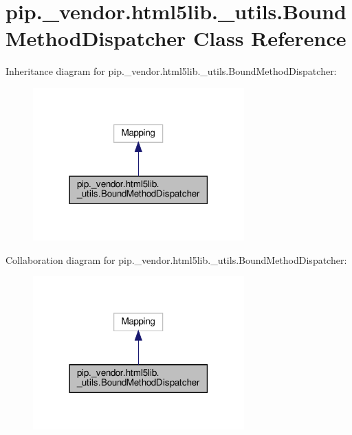 \hypertarget{classpip_1_1__vendor_1_1html5lib_1_1__utils_1_1BoundMethodDispatcher}{}\section{pip.\+\_\+vendor.\+html5lib.\+\_\+utils.\+Bound\+Method\+Dispatcher Class Reference}
\label{classpip_1_1__vendor_1_1html5lib_1_1__utils_1_1BoundMethodDispatcher}


Inheritance diagram for pip.\+\_\+vendor.\+html5lib.\+\_\+utils.\+Bound\+Method\+Dispatcher\+:
\nopagebreak
\begin{figure}[H]
\begin{center}
\leavevmode
\includegraphics[width=230pt]{classpip_1_1__vendor_1_1html5lib_1_1__utils_1_1BoundMethodDispatcher__inherit__graph}
\end{center}
\end{figure}


Collaboration diagram for pip.\+\_\+vendor.\+html5lib.\+\_\+utils.\+Bound\+Method\+Dispatcher\+:
\nopagebreak
\begin{figure}[H]
\begin{center}
\leavevmode
\includegraphics[width=230pt]{classpip_1_1__vendor_1_1html5lib_1_1__utils_1_1BoundMethodDispatcher__coll__graph}
\end{center}
\end{figure}
